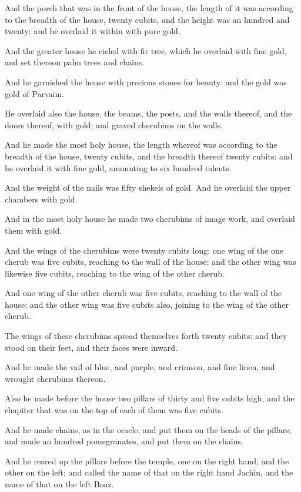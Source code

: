 \Verse And the porch that was in the front of the house, the length of it was according to the breadth of the house, twenty cubits, and the height was an hundred and twenty: and he overlaid it within with pure gold.

\Verse And the greater house he cieled with fir tree, which he overlaid with fine gold, and set thereon palm trees and chains.

\Verse And he garnished the house with precious stones for beauty: and the gold was gold of Parvaim.

\Verse He overlaid also the house, the beams, the posts, and the walls thereof, and the doors thereof, with gold; and graved cherubims on the walls.

\Verse And he made the most holy house, the length whereof was according to the breadth of the house, twenty cubits, and the breadth thereof twenty cubits: and he overlaid it with fine gold, amounting to six hundred talents.

\Verse And the weight of the nails was fifty shekels of gold. And he overlaid the upper chambers with gold.

\Verse And in the most holy house he made two cherubims of image work, and overlaid them with gold.

\Verse And the wings of the cherubims were twenty cubits long: one wing of the one cherub was five cubits, reaching to the wall of the house: and the other wing was likewise five cubits, reaching to the wing of the other cherub.

\Verse And one wing of the other cherub was five cubits, reaching to the wall of the house: and the other wing was five cubits also, joining to the wing of the other cherub.

\Verse The wings of these cherubims spread themselves forth twenty cubits: and they stood on their feet, and their faces were inward.

\Verse And he made the vail of blue, and purple, and crimson, and fine linen, and wrought cherubims thereon.

\Verse Also he made before the house two pillars of thirty and five cubits high, and the chapiter that was on the top of each of them was five cubits.

\Verse And he made chains, as in the oracle, and put them on the heads of the pillars; and made an hundred pomegranates, and put them on the chains.

\Verse And he reared up the pillars before the temple, one on the right hand, and the other on the left; and called the name of that on the right hand Jachin, and the name of that on the left Boaz.



